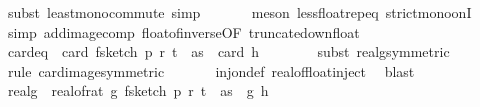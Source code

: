 \begin{isabellebody}
\ {\isacharparenleft}{\kern0pt}subst\ least{\isacharunderscore}{\kern0pt}mono{\isacharunderscore}{\kern0pt}commute{\isacharcomma}{\kern0pt}\ simp{\isacharparenright}{\kern0pt}\isanewline
\ \ \ \ \ \isamarkupfalse%
\ {\isacharparenleft}{\kern0pt}meson\ less{\isacharunderscore}{\kern0pt}float{\isachardot}{\kern0pt}rep{\isacharunderscore}{\kern0pt}eq\ strict{\isacharunderscore}{\kern0pt}mono{\isacharunderscore}{\kern0pt}onI{\isacharparenright}{\kern0pt}\isanewline
\ \ \ \ \isamarkupfalse%
\ {\isacharparenleft}{\kern0pt}simp\ add{\isacharcolon}{\kern0pt}image{\isacharunderscore}{\kern0pt}comp\ float{\isacharunderscore}{\kern0pt}of{\isacharunderscore}{\kern0pt}inverse{\isacharbrackleft}{\kern0pt}OF\ truncate{\isacharunderscore}{\kern0pt}down{\isacharunderscore}{\kern0pt}float{\isacharbrackright}{\kern0pt}{\isacharparenright}{\kern0pt}\isanewline
\isanewline
\ \ \isamarkupfalse%
\ card{\isacharunderscore}{\kern0pt}eq{\isacharcolon}{\kern0pt}\ {\isachardoublequoteopen}{\isasymAnd}{\isasymomega}{\isachardot}{\kern0pt}\ card\ {\isacharparenleft}{\kern0pt}f{}{\isacharunderscore}{\kern0pt}sketch\ p\ r\ t\ {\isasymomega}\ as{\isacharparenright}{\kern0pt}\ {\isacharequal}{\kern0pt}\ card\ {\isacharparenleft}{\kern0pt}h\ {\isasymomega}{\isacharparenright}{\kern0pt}{\isachardoublequoteclose}\ \isanewline
\ \ \ \ \isamarkupfalse%
\ {\isacharparenleft}{\kern0pt}subst\ real{\isacharunderscore}{\kern0pt}g{\isacharunderscore}{\kern0pt}{}{\isacharbrackleft}{\kern0pt}symmetric{\isacharbrackright}{\kern0pt}{\isacharparenright}{\kern0pt}\ \isanewline
\ \ \ \ \isamarkupfalse%
\ {\isacharparenleft}{\kern0pt}rule\ card{\isacharunderscore}{\kern0pt}image{\isacharbrackleft}{\kern0pt}symmetric{\isacharbrackright}{\kern0pt}{\isacharparenright}{\kern0pt}\ \isanewline
\ \ \ \ \isamarkupfalse%
\ inj{\isacharunderscore}{\kern0pt}on{\isacharunderscore}{\kern0pt}def\ real{\isacharunderscore}{\kern0pt}of{\isacharunderscore}{\kern0pt}float{\isacharunderscore}{\kern0pt}inject\ \isamarkupfalse%
\ blast\isanewline
\isanewline
\ \ \isamarkupfalse%
\ real{\isacharunderscore}{\kern0pt}g{\isacharcolon}{\kern0pt}\ {\isachardoublequoteopen}{\isasymAnd}{\isasymomega}{\isachardot}{\kern0pt}\ real{\isacharunderscore}{\kern0pt}of{\isacharunderscore}{\kern0pt}rat\ {\isacharparenleft}{\kern0pt}g\ {\isacharparenleft}{\kern0pt}f{}{\isacharunderscore}{\kern0pt}sketch\ p\ r\ t\ {\isasymomega}\ as{\isacharparenright}{\kern0pt}{\isacharparenright}{\kern0pt}\ {\isacharequal}{\kern0pt}\ g{\isacharprime}{\kern0pt}\ {\isacharparenleft}{\kern0pt}h\ {\isasymomega}{\isacharparenright}{\kern0pt}{\isachardoublequoteclose}\isanewline

\end{isabellebody}
